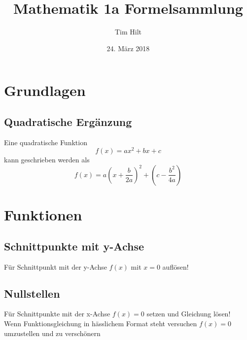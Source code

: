 \message{ !name(Mathe1aFormelsammlung.tex)}\documentclass[8pt, a4paper]{article}
\title{Mathematik 1a Formelsammlung}
\author{Tim Hilt}
\date{24. März 2018}
\begin{document}

\maketitle
\pagebreak

\tableofcontents
\pagebreak

\section{Grundlagen}
\subsection{Quadratische Ergänzung}

Eine quadratische Funktion
\[f(x)=ax^2+bx+c\]
kann geschrieben werden als
\[f(x)=a \left (x+\frac{b}{2a} \right)^2+ \left (c-\frac{b^2}{4a} \right)\]

\setcounter{section}{4}

\section{Funktionen}
\subsection{Schnittpunkte mit y-Achse}
Für Schnittpunkt mit der y-Achse \(f(x)\) mit \(x=0\) auflösen!

\subsection{Nullstellen}
Für Schnittpunkte mit der x-Achse \(f(x)=0\) setzen und Gleichung lösen!\\
Wenn Funktionsgleichung in hässlichem Format steht versuchen \(f(x)=0\) umzustellen und zu verschönern
\end{document}

